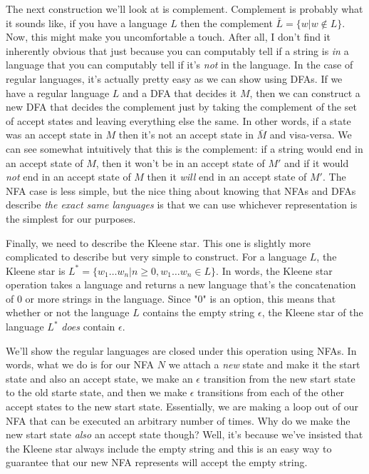 \documentclass[11pt]{article}
\begin{document}
The next construction we'll look at is complement. Complement is probably what it sounds like, if you have a language $L$ then the complement $\bar{L} = \{ w | w \notin L\}$. Now, this might make you uncomfortable a touch. After all, I don't find it inherently obvious that just because you can computably tell if a string is \emph{in} a language that you can computably tell if it's \emph{not} in the language. In the case of regular languages, it's actually pretty easy as we can show using DFAs. If we have a regular language $L$ and a DFA that decides it $M$, then we can construct a new DFA that decides the complement just by taking the complement of the set of accept states and leaving everything else the same. In other words, if a state was an accept state in $M$ then it's not an accept state in $\bar{M}$ and visa-versa. We can see somewhat intuitively that this is the complement: if a string would end in an accept state of $M$, then it won't be in an accept state of $M'$ and if it would \emph{not} end in an accept state of $M$ then it \emph{will} end in an accept state of $M'$. The NFA case is less simple, but the nice thing about knowing that NFAs and DFAs describe \emph{the exact same languages} is that we can use whichever representation is the simplest for our purposes.

Finally, we need to describe the Kleene star. This one is slightly more complicated to describe but very simple to construct. For a language $L$, the Kleene star is $L^* = \{ w_1 \ldots w_n | n \geq 0, w_1 \ldots w_n \in L\}$. In words, the Kleene star operation takes a language and returns a new language that's the concatenation of 0 or more strings in the language. Since "0" is an option, this means that whether or not the language $L$ contains the empty string $\epsilon$, the Kleene star of the language $L^*$ \emph{does} contain $\epsilon$. 

We'll show the regular languages are closed under this operation using NFAs. In words, what we do is for our NFA $N$ we attach a \emph{new} state and make it the start state and also an accept state, we make an $\epsilon$ transition from the new start state to the old starte state, and then we make $\epsilon$ transitions from each of the other accept states to the new start state. Essentially, we are making a loop out of our NFA that can be executed an arbitrary number of times. Why do we make the new start state \emph{also} an accept state though? Well, it's because we've insisted that the Kleene star always include the empty string and this is an easy way to guarantee that our new NFA represents will accept the empty string.
\end{document}
